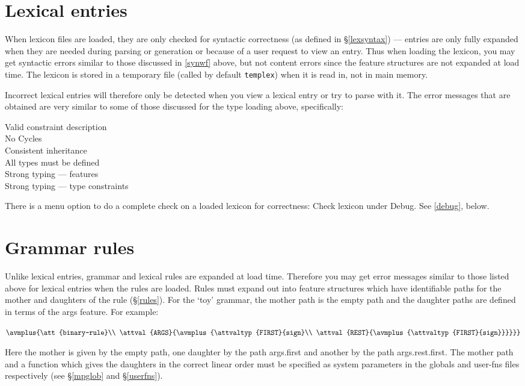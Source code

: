 \documentclass[12pt]{report}
\newcommand{\filename}[1]{{\tt #1}}
\newcommand{\lkbmenucommand}{{\bf}}
\begin{document}
\section{Lexical entries}

When lexicon files are loaded, they are only checked for syntactic correctness 
(as defined in \S\ref{lexsyntax})
--- entries are only fully expanded when they are needed
during parsing or generation
or because of a user request to view an entry.  Thus when loading
the lexicon, you may get syntactic errors similar to those discussed
in \ref{synwf} above, but not content errors since
the feature structures are not expanded
at load time. 
The lexicon is
stored in a temporary file (called by default \filename{templex}) when it
is read in, not in main memory.  

Incorrect lexical entries will therefore only be detected when you view a 
lexical entry or try to parse with it.  The error messages
that are obtained are very similar to some of those discussed for the
type loading above, specifically: 
\begin{description}
\item[Valid constraint description] 
\item[No Cycles]
\item[Consistent inheritance]
\item[All types must be defined]
\item[Strong typing --- features]
\item[Strong typing --- type constraints]
\end{description}

There is a menu option to 
do a complete check on a loaded lexicon for correctness:
{\lkbmenucommand Check lexicon} under {\lkbmenucommand Debug}.  See \ref{debug}, below.

\section{Grammar rules}

Unlike lexical entries, grammar and lexical rules are expanded at load time.
Therefore you may get error messages similar to those listed
above for lexical entries when the rules are loaded.
Rules must expand out into feature structures which have identifiable paths
for the mother and daughters of the rule (\S\ref{rules}).  For the `toy'
grammar, the mother path is the empty path and the daughter
paths are defined in terms of the {\feature args} feature.  For example:
\begin{center}
{\tiny
   $\avmplus{\att{binary-rule}\\
             \attval{ARGS}{\avmplus{\attvaltyp{FIRST}{sign}\\
                                    \attval{REST}{\avmplus{\attvaltyp{FIRST}{sign}}}}}}$}
\end{center}
Here the mother is given by the empty path, one daughter 
by the path {\feature args}.{\feature first} and another by the path
{\feature args}.{\feature rest}.{\feature first}.  
The mother path and a function which gives the
daughters in the correct linear order must be specified as system parameters
in the globals and user-fns files respectively (see \S\ref{mpglob} and
\S\ref{userfns}).
\end{document}
